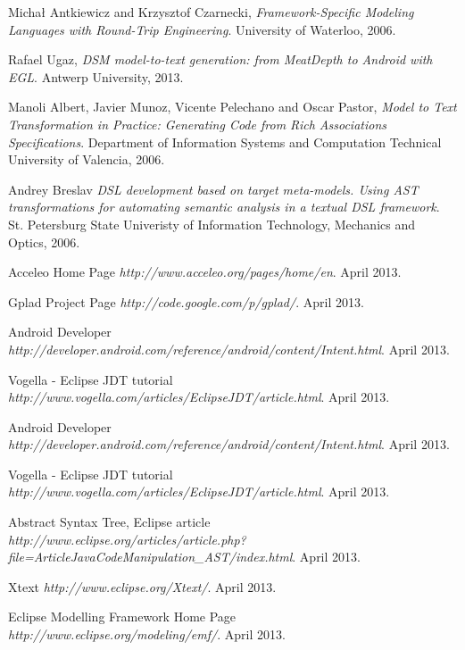 \begin{thebibliography}{9}

  Michał Antkiewicz and Krzysztof Czarnecki,
  \emph{Framework-Specific Modeling Languages with Round-Trip Engineering}.
  University of Waterloo,
  2006.
  
  Rafael Ugaz,
  \emph{DSM model-to-text generation: from MeatDepth to Android with EGL}.
  Antwerp University,
  2013.
 
  Manoli Albert, Javier Munoz, Vicente Pelechano and Oscar Pastor,
  \emph{Model to Text Transformation in Practice: Generating Code from Rich Associations Specifications}.
  Department of Information Systems and Computation Technical University of Valencia,
  2006.  
  
  Andrey Breslav
  \emph{DSL development based on target meta-models. Using AST transformations for automating semantic analysis in a textual DSL framework}.
  St. Petersburg State Univeristy of Information Technology, Mechanics and Optics,
  2006. 

  Acceleo Home Page
  \emph{http://www.acceleo.org/pages/home/en}.
  April 2013. 
  
  Gplad Project Page
  \emph{http://code.google.com/p/gplad/}.
  April 2013. 

  Android Developer
  \emph{http://developer.android.com/reference/android/content/Intent.html}.
  April 2013. 
  
  Vogella - Eclipse JDT tutorial
  \emph{http://www.vogella.com/articles/EclipseJDT/article.html}.
  April 2013. 

  Android Developer\\
  \emph{http://developer.android.com/reference/android/content/Intent.html}.
  April 2013. 
  
  Vogella - Eclipse JDT tutorial\\
  \emph{http://www.vogella.com/articles/EclipseJDT/article.html}.
  April 2013. 
     
  Abstract Syntax Tree, Eclipse article\\
  \emph{http://www.eclipse.org/articles/article.php?file=Article\-JavaCodeManipulation\_AST/index.html}.
  April 2013. 
 
  Xtext
  \emph{http://www.eclipse.org/Xtext/}.
  April 2013.  
  
  Eclipse Modelling Framework Home Page\\
  \emph{http://www.eclipse.org/modeling/emf/}.
  April 2013.  
  
\end{thebibliography}